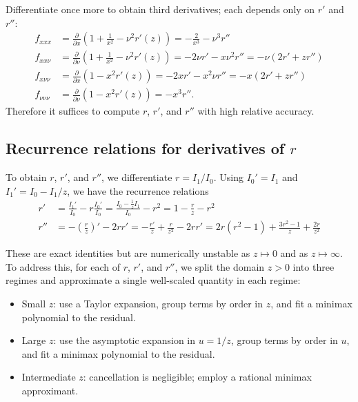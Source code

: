 \documentclass{article}
\begin{document}
Differentiate once more to obtain third derivatives;
each depends only on $r'$ and $r''$:
%
\begin{align}
  f_{xxx}       & = \frac{\partial}{\partial x}\left(1+\frac{1}{x^2}-\nu^2 r'(z)\right) = -\frac{2}{x^3} - \nu^3 r'' \label{eq:third-derivatives-unsimplified-x-x-x}                                 \\
  f_{xx\nu}     & = \frac{\partial}{\partial \nu}\left(1+\frac{1}{x^2}-\nu^2 r'(z)\right) = -2\nu r' - x\nu^2 r'' = -\nu(2r' + z r'')              \label{eq:third-derivatives-unsimplified-x-x-nu}  \\
  f_{x\nu\nu}   & = \frac{\partial}{\partial x}\left(1 - x^2 r'(z)\right) = -2x r' - x^2\nu r'' = -x(2r' + z r'')                                  \label{eq:third-derivatives-unsimplified-x-nu-nu} \\
  f_{\nu\nu\nu} & = \frac{\partial}{\partial \nu}\left(1 - x^2 r'(z)\right) = -x^3 r''. \label{eq:third-derivatives-unsimplified-nu-nu-nu}
\end{align}
%
Therefore it suffices to compute $r$, $r'$, and $r''$ with high relative accuracy.

\subsection{Recurrence relations for derivatives of $r$}

To obtain $r$, $r'$, and $r''$, we differentiate $r=I_1/I_0$.
Using $I_0'=I_1$ and $I_1'=I_0 - I_1/z$, we have the recurrence relations
%
\begin{align}
  r'  & = \frac{I_1'}{I_0} - r\frac{I_0'}{I_0} = \frac{I_0 - \frac{1}{z} I_1}{I_0} - r^2 = 1 - \frac{r}{z} - r^2 \label{eq:r-prime-recurrence}                                           \\
  r'' & = -\left(\frac{r}{z}\right)' - 2 r r' = -\frac{r'}{z} + \frac{r}{z^2} - 2 r r' = 2 r (r^2 - 1) + \frac{3 r^2 - 1}{z} + \frac{2 r}{z^2} \label{eq:r-second-derivative-recurrence}
\end{align}

These are exact identities but are numerically unstable as $z \mapsto 0$ and as $z \mapsto \infty$.
To address this, for each of $r$, $r'$, and $r''$, we split the domain $z>0$ into three regimes and approximate a single well-scaled quantity in each regime:
\begin{itemize}
  \item Small $z$:
        use a Taylor expansion, group terms by order in $z$, and fit a minimax polynomial to the residual.
  \item Large $z$:
        use the asymptotic expansion in $u = 1/z$, group terms by order in $u$, and fit a minimax polynomial to the residual.
  \item Intermediate $z$:
        cancellation is negligible;
        employ a rational minimax approximant.
\end{itemize}
\end{document}
